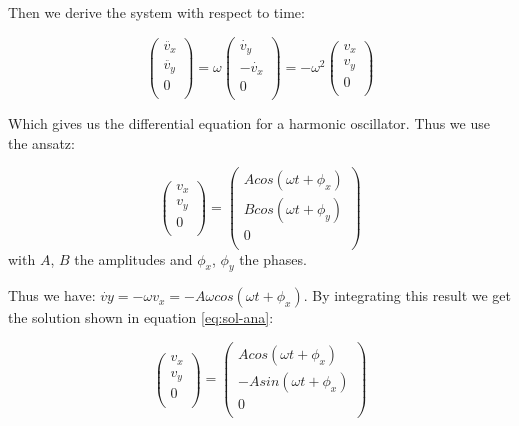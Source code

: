 \documentclass[a4paper,12pt,twoside]{article}
\begin{document}
Then we derive the system with respect to time:

\begin{equation*}
	\begin{pmatrix} \ddot{v_x}\\ \ddot{v_y}\\ 0\\ \end{pmatrix} = \omega \begin{pmatrix} \dot{v_y}\\ -\dot{v_x}\\ 0\\ \end{pmatrix} = -\omega ^2 \begin{pmatrix} v_x\\ v_y\\ 0\\ \end{pmatrix}
\end{equation*}

Which gives us the differential equation for a harmonic oscillator. Thus we use the ansatz:

\begin{equation*}
	\begin{pmatrix} v_x\\ v_y\\ 0\\ \end{pmatrix} = \begin{pmatrix} Acos(\omega t + \phi_x)\\ Bcos(\omega t + \phi_y)\\ 0\\ \end{pmatrix}
\end{equation*}
with $A$, $B$ the amplitudes and $\phi_x$, $\phi_y$ the phases.

Thus we have: $\dot{vy} = -\omega v_x = -A \omega cos (\omega t + \phi_x)$. By integrating this result we get the solution shown in equation \ref{eq:sol-ana}:

\begin{equation*}
	\begin{pmatrix} v_x\\ v_y\\ 0\\ \end{pmatrix} = \begin{pmatrix} Acos(\omega t + \phi_x)\\ -Asin(\omega t + \phi_x)\\ 0\\ \end{pmatrix}
\end{equation*}
\end{document}
